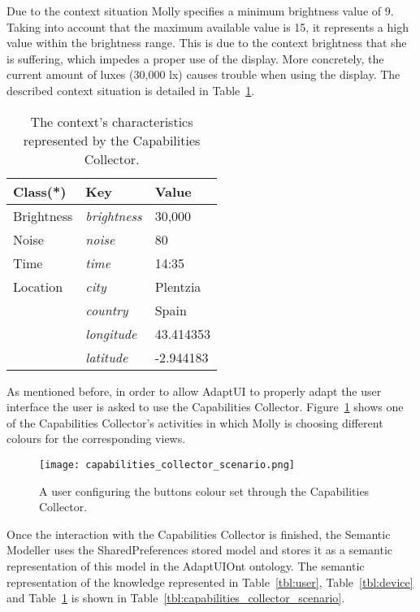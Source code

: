 Due to the context situation Molly specifies a minimum brightness value of 9.
Taking into account that the maximum available value is 15, it represents a
high value within the brightness range. This is due to the context brightness 
that she is suffering, which impedes a proper use of the display. More concretely,
the current amount of luxes (30,000 \ac{lx}) causes trouble when using the
display. The described context situation is detailed in Table~\ref{tbl:context}.

\begin{table}
 \caption{The context's characteristics represented by the Capabilities Collector.}
 \label{tbl:context}
 \footnotesize
 \centering
\begin{tabular}{l l l}
  \hline 
  \textbf{Class(*)}& \textbf{Key} & \textbf{Value}		\\
  \hline
  Brightness	& \textit{brightness}		& 30,000	\\
  Noise		& \textit{noise}		& 80		\\
  Time		& \textit{time}			& 14:35	\\
  Location	& \textit{city}			& Plentzia	\\
		& \textit{country}		& Spain		\\
		& \textit{longitude}		& 43.414353	\\
		& \textit{latitude} 		& -2.944183	\\	
  \hline
\end{tabular}
\end{table}


As mentioned before, in order to allow AdaptUI to properly adapt the user 
interface the user is asked to use the Capabilities Collector. 
Figure~\ref{fig:capabilities_collector_scenario} shows one of the Capabilities
Collector's activities in which Molly is choosing different colours for the
corresponding views.

\begin{figure}
\centering
\texttt{[image: capabilities\_collector\_scenario.png]}
\caption{A user configuring the buttons colour set through the Capabilities Collector.}
\label{fig:capabilities_collector_scenario}
\end{figure}

Once the interaction with the Capabilities Collector is finished, the Semantic 
Modeller uses the SharedPreferences stored model and stores it as a semantic 
representation of this model in the AdaptUIOnt ontology. The semantic representation
of the knowledge represented in Table~\ref{tbl:user}, Table~\ref{tbl:device} and
Table~\ref{tbl:context} is shown in Table~\ref{tbl:capabilities_collector_scenario}.


